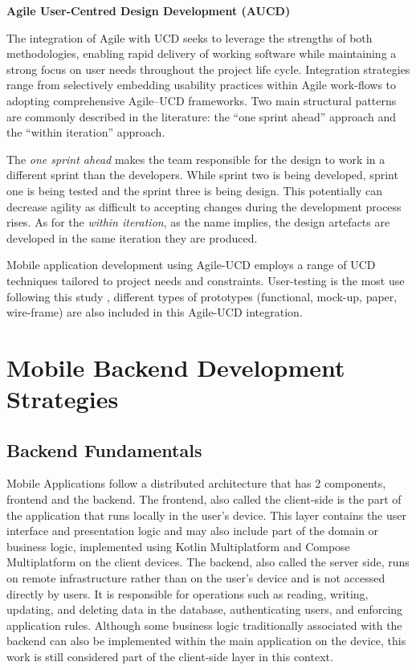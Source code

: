 \textbf{Agile User-Centred Design Development (AUCD)}

The integration of Agile with UCD seeks to leverage the strengths of both methodologies, enabling rapid delivery of working software while maintaining a strong focus on user needs throughout the project life cycle. Integration strategies range from selectively embedding usability practices within Agile work-flows to adopting comprehensive Agile–UCD frameworks. Two main structural patterns are commonly described in the literature: the “one sprint ahead” approach and the “within iteration” approach.\cite{10795519}

The \textit{one sprint ahead} makes the team responsible for the design to work in a different sprint than the developers. While sprint two is being developed, sprint one is being tested and the sprint three is being design.
This potentially can decrease agility as difficult to accepting changes during the development process rises. As for the \textit{within iteration}, as the name implies, the design artefacts are developed in the same iteration they are produced.\cite{10795519}

Mobile application development using Agile-UCD employs a range of UCD techniques tailored to project needs and constraints.
User-testing is the most use following this study \cite{10795519}, different types of prototypes (functional, mock-up, paper, wire-frame) are also included in this Agile-UCD integration.


\section{Mobile Backend Development Strategies}\label{subsec:backend-strategies}

\subsection{Backend Fundamentals}
Mobile Applications follow a distributed architecture that has 2 components, frontend and the backend. The frontend, also called the client-side is the part of the application that runs locally in the user's device.
This layer contains the user interface and presentation logic and may also include part of the domain or business logic, implemented using Kotlin Multiplatform and Compose Multiplatform on the client devices. The backend, also called the server side, runs on remote infrastructure rather than on the user’s device and is not accessed directly by users. It is responsible for operations such as reading, writing, updating, and deleting data in the database, authenticating users, and enforcing application rules. Although some business logic traditionally associated with the backend can also be implemented within the main application on the device, this work is still considered part of the client-side layer in this context.

